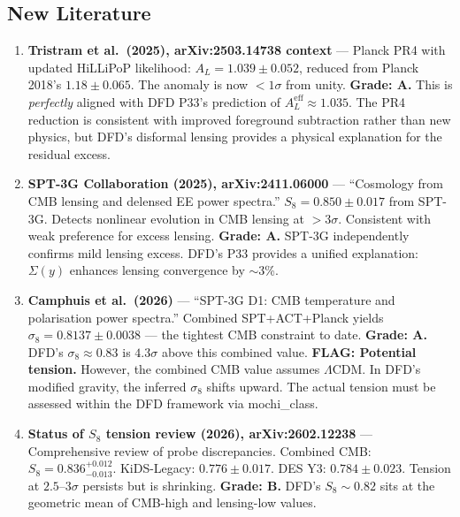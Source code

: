 \documentclass[11pt,a4paper]{article}
\begin{document}
\subsection{New Literature}

\begin{enumerate}

\item \textbf{Tristram et al.\ (2025), arXiv:2503.14738 context} --- Planck PR4 with updated HiLLiPoP likelihood: $A_L = 1.039 \pm 0.052$, reduced from Planck 2018's $1.18 \pm 0.065$. The anomaly is now $<1\sigma$ from unity. \textbf{Grade: A.} This is \emph{perfectly} aligned with DFD P33's prediction of $A_L^\mathrm{eff} \approx 1.035$. The PR4 reduction is consistent with improved foreground subtraction rather than new physics, but DFD's disformal lensing provides a physical explanation for the residual excess.

\item \textbf{SPT-3G Collaboration (2025), arXiv:2411.06000} --- ``Cosmology from CMB lensing and delensed EE power spectra.'' $S_8 = 0.850 \pm 0.017$ from SPT-3G. Detects nonlinear evolution in CMB lensing at $>3\sigma$. Consistent with weak preference for excess lensing. \textbf{Grade: A.} SPT-3G independently confirms mild lensing excess. DFD's P33 provides a unified explanation: $\Sigma(y)$ enhances lensing convergence by $\sim$3\%.

\item \textbf{Camphuis et al.\ (2026)} --- ``SPT-3G D1: CMB temperature and polarisation power spectra.'' Combined SPT+ACT+Planck yields $\sigma_8 = 0.8137 \pm 0.0038$ --- the tightest CMB constraint to date. \textbf{Grade: A.} DFD's $\sigma_8 \approx 0.83$ is $4.3\sigma$ above this combined value. \textbf{FLAG: Potential tension.} However, the combined CMB value assumes $\Lambda$CDM. In DFD's modified gravity, the inferred $\sigma_8$ shifts upward. The actual tension must be assessed within the DFD framework via mochi\_class.

\item \textbf{Status of $S_8$ tension review (2026), arXiv:2602.12238} --- Comprehensive review of probe discrepancies. Combined CMB: $S_8 = 0.836^{+0.012}_{-0.013}$. KiDS-Legacy: $0.776 \pm 0.017$. DES Y3: $0.784 \pm 0.023$. Tension at $2.5$--$3\sigma$ persists but is shrinking. \textbf{Grade: B.} DFD's $S_8 \sim 0.82$ sits at the geometric mean of CMB-high and lensing-low values.

\end{enumerate}
\end{document}

